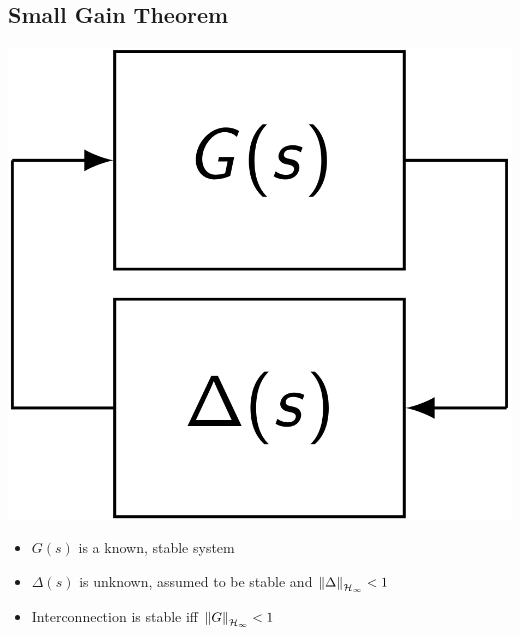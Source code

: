 \subsection{Small Gain Theorem}
    \begin{minipage}{0.3\linewidth}
        \centerline{\includegraphics[width=0.95\linewidth]{src/8_robustness/images/small_gain_theorem.png}}
    \end{minipage}
    \begin{minipage}{0.59\linewidth}
        \begin{itemize}
            \item $G(s)$ is a known, stable system
            \item $\Delta(s)$ is unknown, assumed to be stable and $\left\| \Delta \right\|_{\mathcal{H}_\infty} < 1$
            \item Interconnection is stable iff $\left\| G \right\|_{\mathcal{H}_\infty} < 1$
        \end{itemize}
    \end{minipage}
